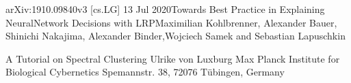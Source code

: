 \begin{thebibliography}{}
		arXiv:1910.09840v3  [cs.LG]  13 Jul 2020Towards Best Practice in Explaining NeuralNetwork Decisions with LRPMaximilian Kohlbrenner, Alexander Bauer, Shinichi Nakajima, Alexander Binder,Wojciech Samek and Sebastian Lapuschkin
		
		 A Tutorial on Spectral Clustering
		Ulrike von Luxburg
		Max Planck Institute for Biological Cybernetics
		Spemannstr. 38, 72076 Tübingen, Germany
				
	\end{thebibliography}
